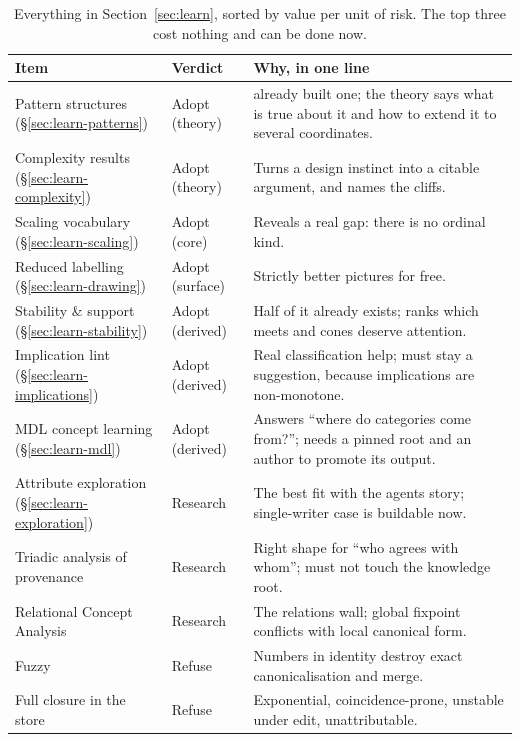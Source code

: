 \begin{table}[h]\centering\small
\caption{Everything in Section~\ref{sec:learn}, sorted by value per unit of
risk. The top three cost nothing and can be done now.}
\label{tab:shopping}
\vspace{1mm}
\begin{tabularx}{\textwidth}{@{}p{4.4cm} p{2.5cm} X@{}}
\toprule
\textbf{Item} & \textbf{Verdict} & \textbf{Why, in one line}\\
\midrule
Pattern structures (\S\ref{sec:learn-patterns})
  & Adopt (theory) & \odag{} already built one; the theory says what is true
    about it and how to extend it to several coordinates.\\
Complexity results (\S\ref{sec:learn-complexity})
  & Adopt (theory) & Turns a design instinct into a citable argument, and
    names the cliffs.\\
Scaling vocabulary (\S\ref{sec:learn-scaling})
  & Adopt (core) & Reveals a real gap: there is no ordinal kind.\\
Reduced labelling (\S\ref{sec:learn-drawing})
  & Adopt (surface) & Strictly better pictures for free.\\
Stability \& support (\S\ref{sec:learn-stability})
  & Adopt (derived) & Half of it already exists; ranks which meets and cones
    deserve attention.\\
Implication lint (\S\ref{sec:learn-implications})
  & Adopt (derived) & Real classification help; must stay a suggestion,
    because implications are non-monotone.\\
MDL concept learning (\S\ref{sec:learn-mdl})
  & Adopt (derived) & Answers ``where do categories come from?''; needs a
    pinned root and an author to promote its output.\\
Attribute exploration (\S\ref{sec:learn-exploration})
  & Research & The best fit with the agents story; single-writer case is
    buildable now.\\
Triadic analysis of provenance
  & Research & Right shape for ``who agrees with whom''; must not touch the
    knowledge root.\\
Relational Concept Analysis
  & Research & The relations wall; global fixpoint conflicts with local
    canonical form.\\
Fuzzy \fca{}
  & Refuse & Numbers in identity destroy exact canonicalisation and merge.\\
Full closure in the store
  & Refuse & Exponential, coincidence-prone, unstable under edit,
    unattributable.\\
\bottomrule
\end{tabularx}
\end{table}


